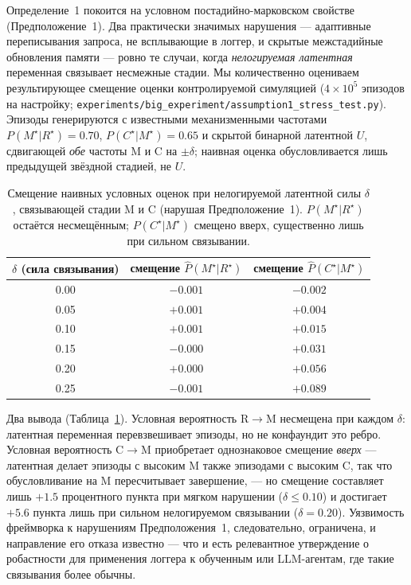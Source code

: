 \documentclass{article}
\newcommand{\method}[1]{\texttt{#1}}
\begin{document}
Определение~1 покоится на условном постадийно-марковском свойстве (Предположение~1). Два практически значимых нарушения --- адаптивные переписывания запроса, не всплывающие в логгер, и скрытые межстадийные обновления памяти --- ровно те случаи, когда \emph{нелогируемая латентная} переменная связывает несмежные стадии. Мы количественно оцениваем результирующее смещение оценки контролируемой симуляцией ($4\!\times\!10^5$ эпизодов на настройку; \method{experiments/big\_experiment/assumption1\_stress\_test.py}). Эпизоды генерируются с известными механизменными частотами $P(M^\star|R^\star){=}0.70$, $P(C^\star|M^\star){=}0.65$ и скрытой бинарной латентной $U$, сдвигающей \emph{обе} частоты M и C на $\pm\delta$; наивная оценка обусловливается лишь предыдущей звёздной стадией, не $U$.

\begin{table}[h]
\caption{Смещение наивных условных оценок при нелогируемой латентной силы $\delta$, связывающей стадии M и C (нарушая Предположение~1). $P(M^\star|R^\star)$ остаётся несмещённым; $P(C^\star|M^\star)$ смещено вверх, существенно лишь при сильном связывании.}
\label{p1:tab:assumption1-stress}
\centering
\small
\begin{tabular}{c c c}
\toprule
$\delta$ (сила связывания) & смещение $\hat P(M^\star|R^\star)$ & смещение $\hat P(C^\star|M^\star)$ \\
\midrule
0.00 & $-0.001$ & $-0.002$ \\
0.05 & $+0.001$ & $+0.004$ \\
0.10 & $+0.001$ & $+0.015$ \\
0.15 & $-0.000$ & $+0.031$ \\
0.20 & $+0.000$ & $+0.056$ \\
0.25 & $-0.001$ & $+0.089$ \\
\bottomrule
\end{tabular}
\end{table}

Два вывода (Таблица~\ref{p1:tab:assumption1-stress}). Условная вероятность R$\to$M несмещена при каждом $\delta$: латентная переменная перевзвешивает эпизоды, но не конфаундит это ребро. Условная вероятность C$\to$M приобретает однознаковое смещение \emph{вверх} --- латентная делает эпизоды с высоким M также эпизодами с высоким C, так что обусловливание на M пересчитывает завершение, --- но смещение составляет лишь $+1.5$ процентного пункта при мягком нарушении ($\delta\!\le\!0.10$) и достигает $+5.6$ пункта лишь при сильном нелогируемом связывании ($\delta{=}0.20$). Уязвимость фреймворка к нарушениям Предположения~1, следовательно, ограничена, и направление его отказа известно --- что и есть релевантное утверждение о робастности для применения логгера к обученным или LLM-агентам, где такие связывания более обычны.
\end{document}
